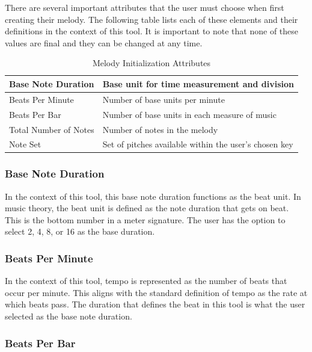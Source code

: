 \pagebreak

There are several important attributes that the user must choose when first creating their melody.  The following table lists each of these elements and their definitions in the context of this tool.  It is important to note that none of these values are final and they can be changed at any time.

\begin{table}[!htbp]
	\centering
	\caption{Melody Initialization Attributes}
	\begin{tabular}{|l|l|}
		\hline
		Base Note Duration & Base unit for time measurement and division \\ \hline
		Beats Per Minute & Number of base units per minute \\ \hline
		Beats Per Bar & Number of base units in each measure of music \\ \hline
		Total Number of Notes & Number of notes in the melody \\ \hline
		Note Set & Set of pitches available within the user's chosen key \\ \hline
	\end{tabular}
\end{table}

\subsubsection{Base Note Duration}
\label{subsubsec:basenoteduration}

In the context of this tool, this base note duration functions as the beat unit.  In music theory, the beat unit is defined as the note duration that gets on beat.  This is the bottom number in a meter signature.  The user has the option to select 2, 4, 8, or 16 as the base duration.

\subsubsection{Beats Per Minute}
\label{subsubsec:beatsperminute}

In the context of this tool, tempo is represented as the number of beats that occur per minute.  This aligns with the standard definition of tempo as the rate at which beats pass.  The duration that defines the beat in this tool is what the user selected as the base note duration.

\subsubsection{Beats Per Bar}
\label{subsubsec:beatsperbar}

